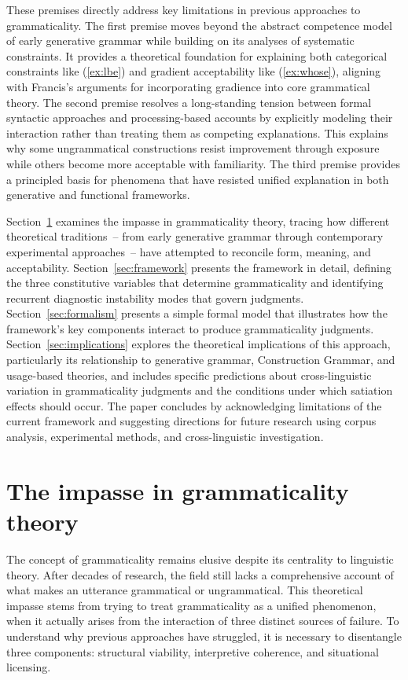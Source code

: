 \documentclass[12pt,letterpaper]{article}
\begin{document}
These premises directly address key limitations in previous approaches to grammaticality. The first premise moves beyond the abstract competence model of early generative grammar while building on its analyses of systematic constraints. It provides a theoretical foundation for explaining both categorical constraints like (\ref{ex:lbe}) and gradient acceptability like (\ref{ex:whose}), aligning with Francis's \autocite{francis2022} arguments for incorporating gradience into core grammatical theory. The second premise resolves a long-standing tension between formal syntactic approaches and processing-based accounts by explicitly modeling their interaction rather than treating them as competing explanations. This explains why some ungrammatical constructions resist improvement through exposure while others become more acceptable with familiarity. The third premise provides a principled basis for phenomena that have resisted unified explanation in both generative and functional frameworks.

Section~\ref{sec:previous} examines the impasse in grammaticality theory, tracing how different theoretical traditions~-- from early generative grammar through contemporary experimental approaches~-- have attempted to reconcile form, meaning, and acceptability. Section~\ref{sec:framework} presents the framework in detail, defining the three constitutive variables that determine grammaticality and identifying recurrent diagnostic instability modes that govern judgments. Section~\ref{sec:formalism} presents a simple formal model that illustrates how the framework's key components interact to produce grammaticality judgments. Section~\ref{sec:implications} explores the theoretical implications of this approach, particularly its relationship to generative grammar, Construction Grammar, and usage-based theories, and includes specific predictions about cross-linguistic variation in grammaticality judgments and the conditions under which satiation effects should occur. The paper concludes by acknowledging limitations of the current framework and suggesting directions for future research using corpus analysis, experimental methods, and cross-linguistic investigation.

\section{The impasse in grammaticality theory}\label{sec:previous}

The concept of grammaticality remains elusive despite its centrality to linguistic theory. After decades of research, the field still lacks a comprehensive account of what makes an utterance grammatical or ungrammatical. This theoretical impasse stems from trying to treat grammaticality as a unified phenomenon, when it actually arises from the interaction of three distinct sources of failure. To understand why previous approaches have struggled, it is necessary to disentangle three components: structural viability, interpretive coherence, and situational licensing.
\end{document}

